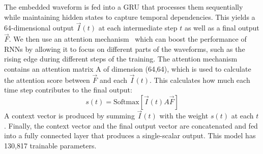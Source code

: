 The embedded waveform is fed into a GRU that processes them sequentially while maintaining hidden states to capture temporal dependencies. This yields a 64-dimensional output $\vec{I}(t)$ at each intermediate step $t$ as well as a final output $\vec{F}$. We then use an attention mechanism~\cite{attention} which can boost the performance of RNNs by allowing it to focus on different parts of the waveforms, such as the rising edge during different steps of the training. The attention mechanism contains an attention matrix A of dimension (64,64), which is used to calculate the attention score between $\vec{F}$ and each $\vec{I}(t)$. This calculates how much each time step contributes to the final output:
\begin{equation}
    s(t) = \mathrm{Softmax}[\vec{I}(t) A \vec{F}]
\end{equation}
A context vector is produced by summing $\vec{I}(t)$ with the weight $s(t)$ at each $t$. Finally, the context vector and the final output vector are concatenated and fed into a fully connected layer that produces a single-scalar output. This model has 130,817 trainable parameters.

